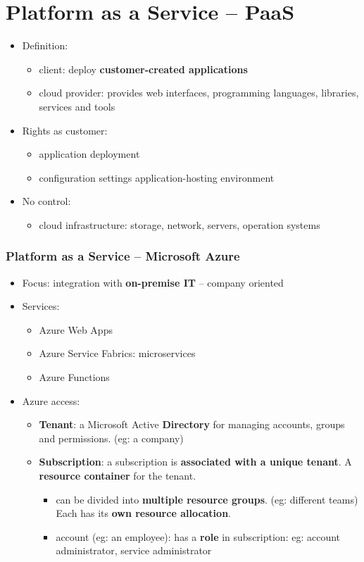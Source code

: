 \part{Platform as a Service -- PaaS}
\begin{itemize}
	\item Definition: 
	\begin{itemize}
		\item client: deploy \textbf{customer-created applications}
		\item cloud provider: provides web interfaces, programming languages, libraries, services and tools 
	\end{itemize}
	\item Rights as customer:
	\begin{itemize}
		\item application deployment
		\item configuration settings application-hosting environment
	\end{itemize}
	\item No control:
	\begin{itemize}
		\item cloud infrastructure: storage, network, servers, operation systems
	\end{itemize}
\end{itemize}

\section{Platform as a Service -- Microsoft Azure}
\begin{itemize}
	\item Focus: integration with \textbf{on-premise IT} -- company oriented
	\item Services:
	\begin{itemize}
		\item Azure Web Apps
		\item Azure Service Fabrics: microservices
		\item Azure Functions
	\end{itemize}
	\item Azure access:
	\begin{itemize}
		\item \textbf{Tenant}: a Microsoft Active \textbf{Directory} for managing accounts, groups and permissions. (eg: a company)
		\item \textbf{Subscription}: a subscription is \textbf{associated with a unique tenant}. A \textbf{resource container} for the tenant.
		\begin{itemize}
			\item can be divided into \textbf{multiple resource groups}. (eg: different teams) Each has its \textbf{own resource allocation}.
			\item account (eg: an employee): has a \textbf{role} in subscription: eg: account administrator, service administrator 
		\end{itemize}
	\end{itemize}
\end{itemize}

